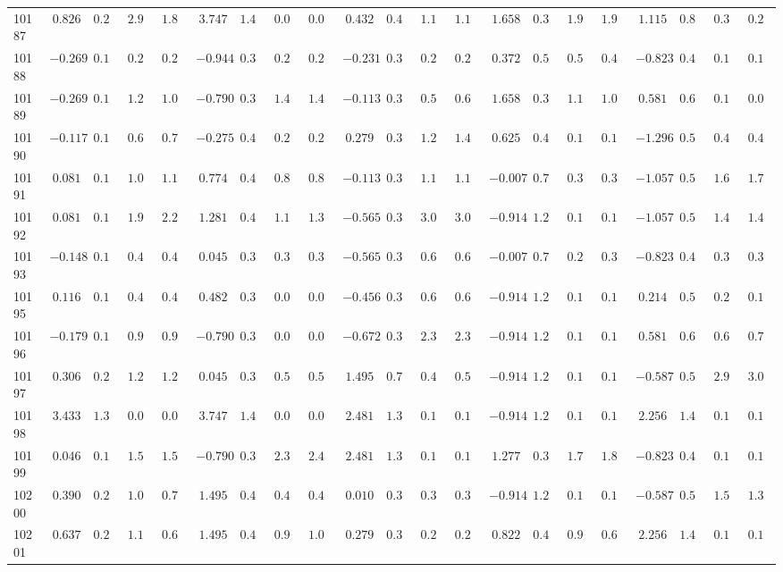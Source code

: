 \documentclass[6pt]{article}
\begin{document}
\begin{landscape}
{\begin{longtable}{lrrrrrrrrrrrrrrrrrrrr}
10187&$ 0.826$&$0.269$&$2.906$&$1.891$&$ 3.747$&$1.435$&$0.083$&$0.086$&$ 0.432$&$0.415$&$1.176$&$1.163$&$ 1.658$&$0.376$&$1.921$&$1.937$&$ 1.115$&$0.851$&$0.303$&$0.292$\tabularnewline
10188&$-0.269$&$0.173$&$0.261$&$0.248$&$-0.944$&$0.376$&$0.205$&$0.205$&$-0.231$&$0.346$&$0.243$&$0.233$&$ 0.372$&$0.563$&$0.530$&$0.438$&$-0.823$&$0.499$&$0.101$&$0.100$\tabularnewline
10189&$-0.269$&$0.173$&$1.213$&$1.010$&$-0.790$&$0.389$&$1.412$&$1.439$&$-0.113$&$0.354$&$0.599$&$0.616$&$ 1.658$&$0.376$&$1.136$&$1.096$&$ 0.581$&$0.677$&$0.154$&$0.093$\tabularnewline
10190&$-0.117$&$0.178$&$0.697$&$0.774$&$-0.275$&$0.402$&$0.272$&$0.268$&$ 0.279$&$0.393$&$1.277$&$1.423$&$ 0.625$&$0.488$&$0.148$&$0.100$&$-1.296$&$0.509$&$0.472$&$0.498$\tabularnewline
10191&$ 0.081$&$0.188$&$1.074$&$1.161$&$ 0.774$&$0.401$&$0.821$&$0.878$&$-0.113$&$0.354$&$1.116$&$1.184$&$-0.007$&$0.714$&$0.316$&$0.348$&$-1.057$&$0.501$&$1.676$&$1.705$\tabularnewline
10192&$ 0.081$&$0.188$&$1.990$&$2.285$&$ 1.281$&$0.457$&$1.176$&$1.304$&$-0.565$&$0.334$&$3.047$&$3.084$&$-0.914$&$1.254$&$0.135$&$0.149$&$-1.057$&$0.501$&$1.495$&$1.458$\tabularnewline
10193&$-0.148$&$0.177$&$0.463$&$0.473$&$ 0.045$&$0.393$&$0.301$&$0.301$&$-0.565$&$0.334$&$0.648$&$0.671$&$-0.007$&$0.714$&$0.299$&$0.321$&$-0.823$&$0.499$&$0.356$&$0.360$\tabularnewline
10195&$ 0.116$&$0.190$&$0.477$&$0.417$&$ 0.482$&$0.389$&$0.097$&$0.098$&$-0.456$&$0.337$&$0.694$&$0.648$&$-0.914$&$1.254$&$0.135$&$0.149$&$ 0.214$&$0.594$&$0.256$&$0.188$\tabularnewline
10196&$-0.179$&$0.176$&$0.960$&$0.999$&$-0.790$&$0.389$&$0.054$&$0.055$&$-0.672$&$0.332$&$2.341$&$2.358$&$-0.914$&$1.254$&$0.135$&$0.149$&$ 0.581$&$0.677$&$0.678$&$0.730$\tabularnewline
10197&$ 0.306$&$0.204$&$1.249$&$1.259$&$ 0.045$&$0.393$&$0.562$&$0.568$&$ 1.495$&$0.741$&$0.470$&$0.516$&$-0.914$&$1.254$&$0.135$&$0.149$&$-0.587$&$0.505$&$2.915$&$3.082$\tabularnewline
10198&$ 3.433$&$1.352$&$0.030$&$0.034$&$ 3.747$&$1.435$&$0.083$&$0.086$&$ 2.481$&$1.316$&$0.105$&$0.119$&$-0.914$&$1.254$&$0.135$&$0.149$&$ 2.256$&$1.456$&$0.164$&$0.191$\tabularnewline
10199&$ 0.046$&$0.186$&$1.503$&$1.549$&$-0.790$&$0.389$&$2.383$&$2.418$&$ 2.481$&$1.316$&$0.105$&$0.119$&$ 1.277$&$0.383$&$1.793$&$1.898$&$-0.823$&$0.499$&$0.101$&$0.100$\tabularnewline
10200&$ 0.390$&$0.212$&$1.049$&$0.755$&$ 1.495$&$0.495$&$0.461$&$0.473$&$ 0.010$&$0.363$&$0.341$&$0.350$&$-0.914$&$1.254$&$0.135$&$0.149$&$-0.587$&$0.505$&$1.515$&$1.343$\tabularnewline
10201&$ 0.637$&$0.240$&$1.181$&$0.671$&$ 1.495$&$0.495$&$0.942$&$1.004$&$ 0.279$&$0.393$&$0.242$&$0.281$&$ 0.822$&$0.443$&$0.902$&$0.618$&$ 2.256$&$1.456$&$0.164$&$0.191$\tabularnewline

\end{longtable}}
\end{landscape}
\end{document}
